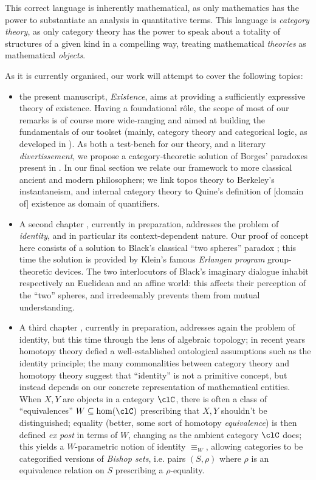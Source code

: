 This correct language is inherently mathematical, as only mathematics has the power to substantiate an analysis in quantitative terms. This language is \emph{category theory}, as only category theory has the power to speak about a totality of structures of a given kind in a compelling way, treating mathematical \emph{theories} as mathematical \emph{objects}.

As it is currently organised, our work will attempt to cover the following topics:
\begin{itemize}
	\item the present manuscript, \emph{Existence}, aims at providing a sufficiently expressive theory of existence. Having a foundational r\^ole, the scope of most of our remarks is of course more wide-ranging and aimed at building the fundamentals of our toolset (mainly, category theory and categorical logic, as developed in \cite{mac1992sheaves,JohnstonePT,lambek1988introduction}). As both a test-bench for our theory, and a literary \emph{divertissement}, we propose a category-theoretic solution of Borges' paradoxes present in \cite{Borges1963}. In our final section we relate our framework to more classical ancient and modern philosophers; we link topos theory to Berkeley's instantaneism, and internal category theory to Quine's definition of [domain of] existence as domain of quantifiers.
	\item A second chapter \cite{black}, currently in preparation, addresses the problem of \emph{identity}, and in particular its context-dependent nature. Our proof of concept here consists of a solution to Black's classical ``two spheres'' paradox \cite{papear_di_black}; this time the solution is provided by Klein's famous \emph{Erlangen program} group-theoretic devices. The two interlocutors of Black's imaginary dialogue inhabit respectively an Euclidean and an affine world: this affects their perception of the ``two'' spheres, and irredeemably prevents them from mutual understanding.
	\item A third chapter \cite{homot}, currently in preparation, addresses again the problem of identity, but this time through the lens of algebraic topology; in recent years homotopy theory defied a well\hyp{}established ontological assumptions such as the identity principle; the many commonalities between category theory and homotopy theory suggest that ``identity'' is not a primitive concept, but instead depends on our concrete representation of mathematical entities. When $X,Y$ are objects in a category $\clC$, there is often a class of ``equivalences'' $W \subseteq \hom(\clC)$ prescribing that $X,Y$ shouldn't be distinguished; equality (better, some sort of homotopy \emph{equivalence}) is then defined \emph{ex post} in terms of $W$, changing as the ambient category $\clC$ does; this yields a $W$-parametric notion of identity $\equiv_W$, allowing categories to be categorified versions of \emph{Bishop sets}, i.e. pairs $(S,\rho)$ where $\rho$ is an equivalence relation on $S$ prescribing a $\rho$-equality.
\end{itemize}
